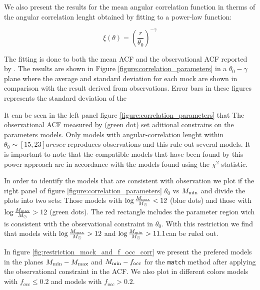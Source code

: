 \documentclass[usenatbib]{mn2e}
\begin{document}
We also present the results for the mean angular correlation function in
therms of the angular correlation lenght obtained  by fitting to a power-law
function:  

\begin{equation}
\xi(\theta) = \left(\frac{r}{\theta_{0}}\right)^{-\gamma}
\end{equation}

The fitting is done to both the mean ACF and the observational
ACF reported by \cite{Hayashino2004} .  The results are shown 
in Figure  \ref{figure:correlation_parameters}  in a $\theta_{0}-\gamma$ 
plane where the average and standard deviation for each mock 
are shown in comparison with the result derived from observations. 
Error bars in these figures represents the standard deviation of the

It can be seen in the left panel figure \ref{figure:correlation_parameters} that
The observational ACF measured by \cite{Hayashino2004} (green dot) set aditional 
constrains on the parameters models. Only models with angular-correlation lenght within  
$\theta_{0}\sim[15,23]arcsec$ reproduces observations and this rule out several models. 
It is important to note that the compatible models that have been found by this power
approach are in accordance with the models found using the $\chi^{2}$ statistic.

In order to identify the models that are consistent with observation we
plot if the right panel of figure \ref{figure:correlation_parameters} 
$\theta_{0}$ vs $M_{\rm min}$ and divide the plots into two sets: Those models
with $\log \frac{M_{\rm max}}{M_{\odot}}<12$ (blue dots) and those with 
$\log \frac{M_{\rm max}}{M_{\odot}}>12$ (green dots). The red rectangle includes
the parameter region wich is consistent with the observational constraint in $\theta_{0}$.
With this restriction we find that models with $\log \frac{M_{\rm max}}{M_{\odot}}>12$ and
$\log \frac{M_{\rm min}}{M_{\odot}}>11.1$can be ruled out.


In figure \ref{fig:restriction_mock_and_f_occ_corr} we present the prefered
models in the planes $M_{\rm min}-M_{\rm  max}$ and $M_{\rm min}-f_{\rm occ}$
for the {\tt match} method after applying the observational constraint
in the ACF. We also plot in different colors models with $f_{occ}\leq0.2$ and
models with $f_{occ} > 0.2$.
\end{document}
